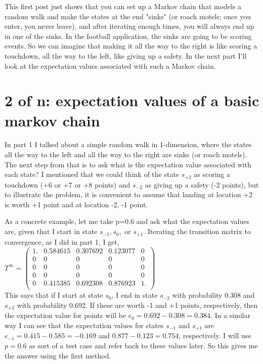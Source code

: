 \documentclass{article}
\begin{document}
This first post just shows that you can set up a Markov chain that models a random walk and make the states at the end "sinks" (or roach motels; once you enter, you never leave), and after iterating enough times, you will always end up in one of the sinks. In the football application, the sinks are going to be scoring events. So we can imagine that making it all the way to the right is like scoring a touchdown, all the way to the left, like giving up a safety. In the next part I'll look at the expectation values associated with such a Markov chain.


\section{2 of n: expectation values of a basic markov chain}

In part 1 I talked about a simple random walk in 1-dimension, where the states all the way to the left and all the way to the right are sinks (or roach motels). The next step from that is to ask what is the expectation value associated with each state? I mentioned that we could think of the state $s_{+2}$ as scoring a touchdown (+6 or +7 or +8 points) and $s_{-2}$ as giving up a safety (-2 points), but to illustrate the problem, it is convenient to assume that landing at location +2 is worth +1 point and at location -2, -1 point. 

As a concrete example, let me take p=0.6 and ask what the expectation values are, given that I start in state $s_{-1}, s_{0},$ or $s_{+1}$. Iterating the transition matrix to convergence, as I did in part 1, I get, \\

$T^{\infty} = 
\left(
\begin{array}{ccccc}
 1. & 0.584615 & 0.307692 & 0.123077 & 0 \\
 0 & 0 & 0 & 0 & 0 \\
 0 & 0 & 0 & 0 & 0 \\
 0 & 0 & 0 & 0 & 0 \\
 0 & 0.415385 & 0.692308 & 0.876923 & 1. \\
\end{array}
\right)
$ \\

This says that if I start at state $s_0$, I end in state $s_{-2}$ with probability 0.308 and $s_{+2}$ with probability 0.692. If these are worth -1 and +1 points, respectively, then the expectation value for points will be $e_{0} = 0.692-0.308 = 0.384$. In a similar way I can see that the expectation values for states $s_{-1}$ and $s_{+1}$ are $e_{-1} = 0.415-0.585 = -0.169$ and $0.877-0.123 = 0.754$, respectively. I will use $p=0.6$ as sort of a test case and refer back to these values later. So this gives me the answer using the first method. 
\end{document}
